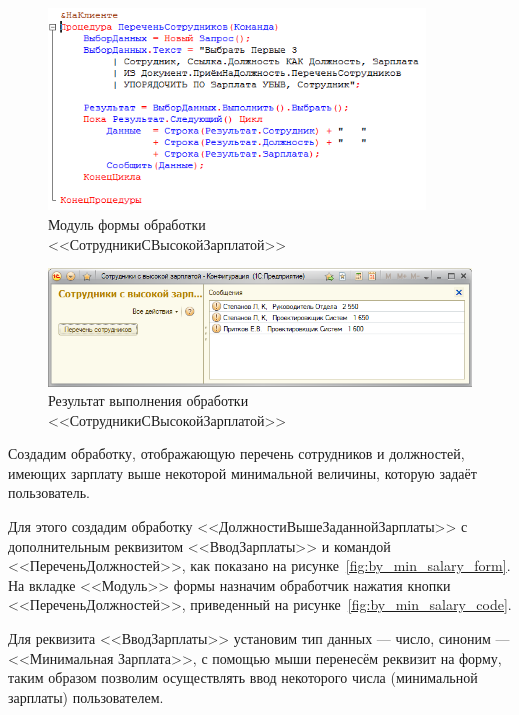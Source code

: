 \begin{figure}[h!]
  \centering
  \includegraphics[width=100mm]{pic/first_three_code}
  \caption{Модуль формы обработки \\ <<СотрудникиСВысокойЗарплатой>>}
  \label{fig:first_three_code}
\end{figure}

\begin{figure}[h!]
  \centering
  \includegraphics[width=140mm]{pic/first_three_results}
  \caption{Результат выполнения обработки \\ <<СотрудникиСВысокойЗарплатой>>}
  \label{fig:first_three_results}
\end{figure}

\pagebreak



Создадим обработку, отображающую перечень сотрудников и должностей, имеющих зарплату
выше некоторой минимальной величины, которую задаёт пользователь.

Для этого создадим обработку <<ДолжностиВышеЗаданнойЗарплаты>>
с дополнительным реквизитом <<ВводЗарплаты>> и командой
<<ПереченьДолжностей>>, как показано на рисунке~\ref{fig:by_min_salary_form}.
На вкладке <<Модуль>> формы назначим обработчик нажатия кнопки
<<ПереченьДолжностей>>, приведенный на рисунке~\ref{fig:by_min_salary_code}.

Для реквизита <<ВводЗарплаты>> установим тип данных --- число,
синоним --- <<Минимальная Зарплата>>, с помощью мыши
перенесём реквизит на форму, таким образом позволим осуществлять
ввод некоторого числа (минимальной зарплаты) пользователем.


